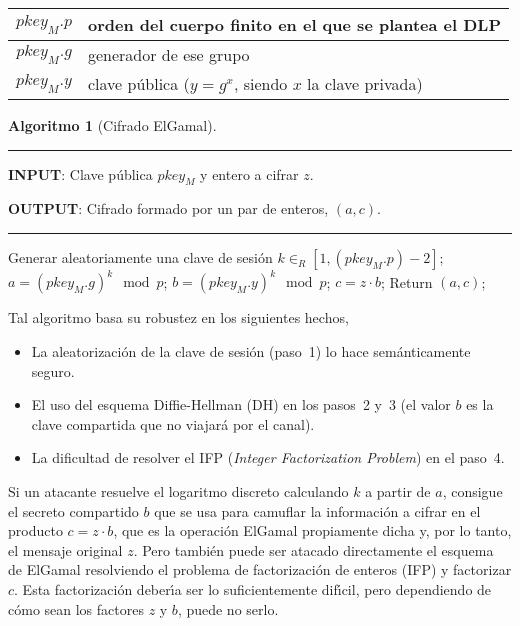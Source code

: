 \documentclass{llncs}
\theoremstyle{plain}        			%
\theoremstyle{definition}   			%
\theoremstyle{saltolinea}   			%
\newtheorem{algo}{Algoritmo}
\begin{document}
\begin{center}\begin{tabular}{c|l}$pkey_M.p$ & \hspace{2mm} orden del cuerpo finito en el que se plantea el DLP \\ \hline $pkey_M.g$ & \hspace{2mm} generador de ese grupo\\ \hline $pkey_M.y$ & \hspace{2mm} clave p\'ublica ($y=g^x$, siendo $x$ la clave privada)\end{tabular}\end{center}

\begin{algo}[Cifrado ElGamal]\label{alg:ElGamal}
\parbox[b]{\linewidth}{%
\hrule
\smallskip
{\bf INPUT}: Clave p\'ublica $pkey_{M}$ y entero a cifrar $z$.

{\bf OUTPUT}: Cifrado formado por un par de enteros, $(a,c)$.
\vspace{1.5mm}
\hrule
}%
\begin{algorithmic}[1]
\STATE Generar aleatoriamente una clave de sesi\'on $k\in_{R}\left[1,\left(pkey_{M}.p\right)-2\right]$;
\STATE $a=(pkey_{M}.g)^{k}\mod p$;
\STATE $b=(pkey_{M}.y)^{k}\mod p$; 
\STATE $c=z\cdot b$;
\STATE Return $(a,c)$;
\end{algorithmic}
\end{algo}%

Tal algoritmo basa su robustez en los siguientes hechos,
\begin{itemize}
	\item La aleatorizaci\'on de la clave de sesi\'on (paso~1) lo hace sem\'anticamente seguro.
	\item El uso del esquema Diffie-Hellman (DH) en los pasos~2 y~3 (el valor $b$ es la clave compartida que no viajar\'a por el canal).
	\item La dificultad de resolver el IFP (\emph{Integer Factorization Problem}) en el paso~4. 
\end{itemize}
Si un atacante resuelve el logaritmo discreto calculando $k$ a partir de $a$, consigue el secreto compartido $b$ que se usa para camuflar la informaci\'on a cifrar en el producto $c=z\cdot b$, que es la operaci\'on ElGamal propiamente dicha y, por lo tanto, el mensaje original $z$. Pero tambi\'en puede ser atacado directamente el esquema de ElGamal resolviendo el problema de factorizaci\'on de enteros (IFP) y factorizar $c$. Esta factorizaci\'on deber\'{\i}a ser lo suficientemente dif\'{\i}cil, pero dependiendo de c\'omo sean los factores $z$ y $b$, puede no serlo.
\end{document}
